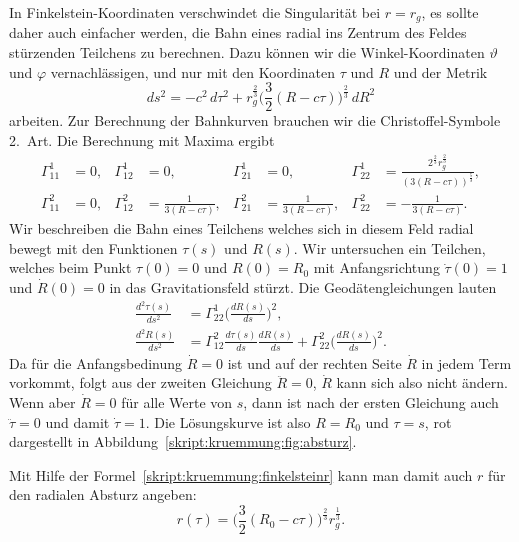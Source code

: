 In Finkelstein-Koordinaten verschwindet die Singularität bei $r=r_g$,
es sollte daher auch einfacher werden, die Bahn eines radial ins
Zentrum des Feldes stürzenden Teilchens zu berechnen.
Dazu können wir die Winkel-Koordinaten $\vartheta$ und $\varphi$
vernachlässigen, und nur mit den Koordinaten $\tau$ und $R$ und der
Metrik
\[
ds^2
=
-c^2 \,d\tau^2
+r _g^{\frac23}\biggl(\frac32(R-c\tau)\biggr)^{\frac23}\,dR^2
\]
arbeiten.
Zur Berechnung der Bahnkurven brauchen wir die Christoffel-Symbole
2.~Art.
Die Berechnung mit Maxima ergibt
\begin{align*}
\Gamma^1_{11} &= 0,&
\Gamma^1_{12} &= 0,&
\Gamma^1_{21} &= 0,&
\Gamma^1_{22} &= \frac{2^{\frac23}r_g^{\frac23}}{(3(R-c\tau))^{\frac53}},\\
\Gamma^2_{11} &= 0,&
\Gamma^2_{12} &= \frac1{3(R-c\tau)},&
\Gamma^2_{21} &= \frac1{3(R-c\tau)},&
\Gamma^2_{22} &= -\frac1{3(R-c\tau)}.
\end{align*}
Wir beschreiben die Bahn eines Teilchens welches sich in diesem Feld
radial bewegt mit den Funktionen $\tau(s)$ und $R(s)$.
Wir untersuchen ein Teilchen, welches beim Punkt $\tau(0)=0$ und $R(0)=R_0$
mit Anfangsrichtung $\dot\tau(0)=1$ und $\dot R(0)=0$ in das Gravitationsfeld
stürzt.
Die Geodätengleichungen lauten
\begin{align*}
\frac{d^2\tau(s)}{ds^2}
&=
\Gamma^1_{22}\biggl(\frac{dR(s)}{ds}\biggr)^2,
\\
\frac{d^2R(s)}{ds^2}
&=
\Gamma^2_{12}\frac{d\tau(s)}{ds}\frac{dR(s)}{ds}
+
\Gamma^2_{22}\biggl(\frac{dR(s)}{ds}\biggr)^2.
\end{align*}
Da für die Anfangsbedinung $\dot R=0$ ist und auf der rechten Seite
$\dot R$ in jedem Term vorkommt, folgt aus der zweiten Gleichung
$\ddot R=0$, $\dot R$ kann sich also nicht ändern.
Wenn aber $\dot R=0$ für alle Werte von $s$, dann ist nach der ersten
Gleichung auch $\ddot \tau=0$ und damit $\dot \tau=1$.
Die Lösungskurve ist also $R=R_0$ und $\tau=s$, rot dargestellt in
Abbildung~\ref{skript:kruemmung:fig:absturz}.

Mit Hilfe der Formel~\eqref{skript:kruemmung:finkelsteinr}
kann man damit auch $r$ für den radialen Absturz angeben:
\[
r(\tau)=\biggl(\frac32(R_0-c\tau)\biggr)^{\frac23}r_g^{\frac13}.
\]

